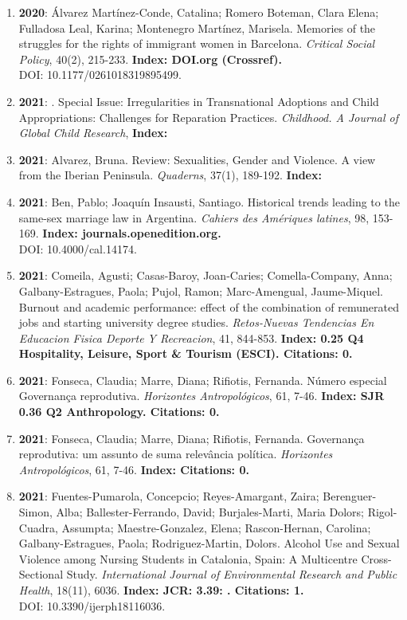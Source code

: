 \begin{enumerate}
\item {\bf 2020}: Álvarez Martínez-Conde, Catalina; Romero Boteman, Clara Elena; Fulladosa Leal, Karina; Montenegro Martínez, Marisela.  Memories of the struggles for the rights of immigrant women in Barcelona. {\it Critical Social Policy}, 40(2), 215-233. {\bf Index: DOI.org (Crossref). } \\ DOI: 10.1177/0261018319895499. \filbreak
\item {\bf 2021}: .  Special Issue: Irregularities in Transnational Adoptions and Child Appropriations: Challenges for Reparation Practices. {\it Childhood. A Journal of Global Child Research}, {\bf Index: } \filbreak
\item {\bf 2021}: Alvarez, Bruna.  Review: Sexualities, Gender and Violence. A view from the Iberian Peninsula. {\it Quaderns}, 37(1), 189-192. {\bf Index: } \filbreak
\item {\bf 2021}: Ben, Pablo; Joaquín Insausti, Santiago.  Historical trends leading to the same-sex marriage law in Argentina. {\it Cahiers des Amériques latines}, 98, 153-169. {\bf Index: journals.openedition.org. } \\ DOI: 10.4000/cal.14174. \filbreak
\item {\bf 2021}: Comeila, Agusti; Casas-Baroy, Joan-Caries; Comella-Company, Anna; Galbany-Estragues, Paola; Pujol, Ramon; Marc-Amengual, Jaume-Miquel.  Burnout and academic performance: effect of the combination of remunerated jobs and starting university degree studies. {\it Retos-Nuevas Tendencias En Educacion Fisica Deporte Y Recreacion}, 41, 844-853. {\bf Index: 0.25 Q4 Hospitality, Leisure, Sport \& Tourism (ESCI). Citations: 0. } \filbreak
\item {\bf 2021}: Fonseca, Claudia; Marre, Diana; Rifiotis, Fernanda.  Número especial Governança reprodutiva. {\it Horizontes Antropológicos}, 61, 7-46. {\bf Index: SJR 0.36 Q2 Anthropology. Citations: 0. } \filbreak
\item {\bf 2021}: Fonseca, Claudia; Marre, Diana; Rifiotis, Fernanda.  Governança reprodutiva: um assunto de suma relevância política. {\it Horizontes Antropológicos}, 61, 7-46. {\bf Index: Citations: 0. } \filbreak
\item {\bf 2021}: Fuentes-Pumarola, Concepcio; Reyes-Amargant, Zaira; Berenguer-Simon, Alba; Ballester-Ferrando, David; Burjales-Marti, Maria Dolors; Rigol-Cuadra, Assumpta; Maestre-Gonzalez, Elena; Rascon-Hernan, Carolina; Galbany-Estragues, Paola; Rodriguez-Martin, Dolors.  Alcohol Use and Sexual Violence among Nursing Students in Catalonia, Spain: A Multicentre Cross-Sectional Study. {\it International Journal of Environmental Research and Public Health}, 18(11), 6036. {\bf Index: JCR: 3.39: .  Citations: 1. } \\ DOI: 10.3390/ijerph18116036. \filbreak

\end{enumerate}
